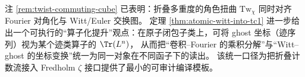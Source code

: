 \begin{remark}\label{rem:operator-fourier-witt-unification}
注 \ref{rem:twist-commuting-cube} 已表明：折叠多重度的角色扭曲 \(\mathrm{Tw}_\chi\) 同时对齐 Fourier 对角化与 Witt/Euler 交换图。
定理 \ref{thm:atomic-witt-into-tc1} 进一步给出一个可执行的“算子化提升”观点：在原子闭包子类上，可将 ghost 坐标（迹序列）视为某个迹类算子的 \(\Tr(L^n)\)，
从而把“卷积--Fourier 的乘积分解”与“Witt--ghost 的坐标变换”统一为同一对象在不同函子下的读出。
该统一口径为把折叠计数流接入 Fredholm \(\zeta\) 接口提供了最小的可审计编译模板。
\end{remark}

\endinput


